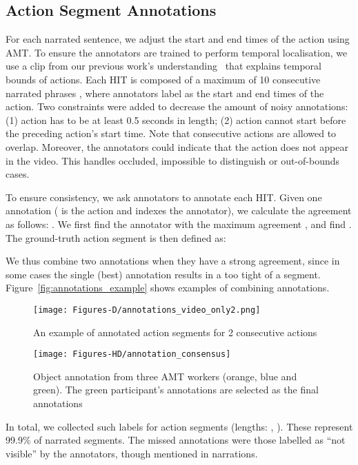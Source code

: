 \documentclass[runningheads]{llncs}
\begin{document}
\subsection{Action Segment Annotations}
\label{subsec:strongAction}

For each narrated sentence, we adjust the start and end times of the action using AMT. 
To ensure the annotators are trained to perform temporal localisation, we use a clip from our previous work's understanding~\cite{Moltisanti2017} that explains temporal bounds of actions.
Each HIT is composed of a maximum of 10 consecutive narrated phrases , where annotators label  as the start and end times of the  action. Two constraints were added to decrease the amount of noisy annotations: (1) action has to be at least 0.5 seconds in length; (2) action cannot start before the preceding action's start time. Note that consecutive actions are allowed to overlap.
Moreover, the annotators could indicate that the action does not appear in the video. This handles occluded, impossible to distinguish or out-of-bounds cases.

To ensure consistency, we ask  annotators to annotate each HIT. Given one annotation  ( is the action and  indexes the annotator), we calculate the agreement as follows: . We first find the annotator with the maximum agreement , and find . The ground-truth action segment  is then defined as:

We thus combine two annotations when they
have a strong agreement, since in some cases the single (best) annotation results in a too tight of a segment. Figure~\ref{fig:annotations_example} shows examples of combining annotations.

\begin{figure}[t]
\centering
\texttt{[image: Figures-D/annotations\_video\_only2.png]}
\caption{An example of annotated action segments for 2 consecutive actions}
\label{fig:annotations_example}
\vspace*{10pt}

\texttt{[image: Figures-HD/annotation\_consensus]}
\caption{Object annotation from three AMT workers (orange, blue and green). The green participant's annotations are selected as the final annotations}
\label{fig:object_ann}
\end{figure}

In total, we collected such labels for  action segments (lengths: , ). These represent 99.9\%  of narrated segments. The missed annotations were those labelled as ``not visible'' by the annotators, though mentioned in narrations. 
\end{document}
